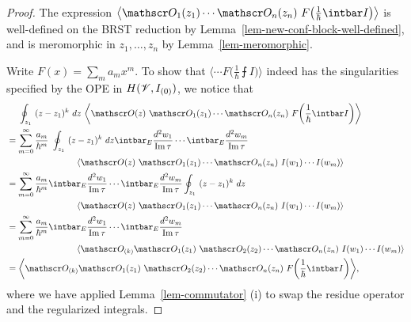 \begin{proof}
    \allowdisplaybreaks
    The expression
    $\bigl\langle \scrO_1 (z_1) \cdots \scrO_n (z_n) \ 
    F \bigl( \frac{1}{\hbar} \intbar I \bigr) \bigr\rangle$
    is well-defined on the BRST reduction by
    Lemma~\ref{lem-new-conf-block-well-defined},
    and is meromorphic in $z_1, \dotsc, z_n$
    by Lemma~\ref{lem-meromorphic}.
    
    Write $F (x) = \sum_m a_m x^m$.
    To show that
    $\bigl\langle \cdots F \bigl( \frac{1}{\hbar} \intbar I \bigr) \bigr\rangle$
    indeed has the singularities specified by the OPE in
    $H (\mathscr{V}, I_{(0)})$, we notice that
    \begin{align*}
        & \phantom{{} = {}}
        \oint_{z_1} \ 
        (z - z_1)^k \ d z \ 
        \biggl\langle
            \scrO (z) \ 
            \scrO_1 (z_1) \cdots \scrO_n (z_n) \ 
            F \biggl( \frac{1}{\hbar} \intbar I \biggr)
        \biggr\rangle \\
        & =
        \sum _{m = 0} ^{\infty}
        \frac {a_m} {\hbar^m} \ 
        \oint_{z_1} \ 
        (z - z_1)^k \ d z
        \intbar_E \frac {d^2 w_1} {\im \tau}
        \cdots
        \intbar_E \frac {d^2 w_m} {\im \tau} \\
        & \hspace{8em}
        \langle
            \scrO (z) \ 
            \scrO_1 (z_1) \cdots \scrO_n (z_n) \ 
            I (w_1) \cdots I (w_m)
        \rangle \\
        & =
        \sum _{m = 0} ^{\infty}
        \frac {a_m} {\hbar^m} 
        \intbar_E \frac {d^2 w_1} {\im \tau}
        \cdots
        \intbar_E \frac {d^2 w_m} {\im \tau}
        \oint_{z_1} \ 
        (z - z_1)^k \ d z \\
        & \hspace{8em}
        \langle
            \scrO (z) \ 
            \scrO_1 (z_1) \cdots \scrO_n (z_n) \ 
            I (w_1) \cdots I (w_m)
        \rangle \\
        & =
        \sum _{m = 0} ^{\infty}
        \frac {a_m} {\hbar^m} 
        \intbar_E \frac {d^2 w_1} {\im \tau}
        \cdots
        \intbar_E \frac {d^2 w_m} {\im \tau} \\
        & \hspace{8em}
        \langle
            \scrO_{(k)} \scrO_1 (z_1) \ 
            \scrO_2 (z_2) \cdots \scrO_n (z_n) \ 
            I (w_1) \cdots I (w_m)
        \rangle \\
        & =
        \biggl\langle
            \scrO_{(k)} \scrO_1 (z_1) \ 
            \scrO_2 (z_2) \cdots \scrO_n (z_n) \ 
            F \biggl( \frac{1}{\hbar} \intbar I \biggr)
        \biggr\rangle ,
    \end{align*}
    where we have applied Lemma~\ref{lem-commutator} (i)
    to swap the residue operator and the regularized integrals.
    

\end{proof}
